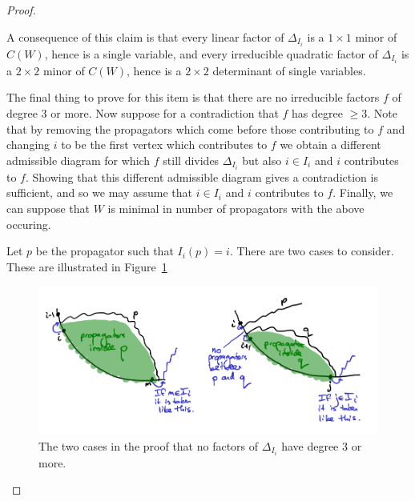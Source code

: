 \documentclass[11pt]{article}
\theoremstyle{remark}
\theoremstyle{definition}
\begin{document}
\begin{proof}
\begin{enumerate}
A consequence of this claim is that every linear factor of $\Delta_{I_i}$ is a $1\times 1$ minor of $C(W)$, hence is a single variable, and every irreducible quadratic factor of $\Delta_{I_i}$ is a $2\times 2$ minor of $C(W)$, hence is a $2\times 2$ determinant of single variables.

The final thing to prove for this item is that there are no irreducible factors $f$ of degree 3 or more.  Now suppose for a contradiction that $f$ has degree $\geq 3$. Note that by removing the propagators which come before those contributing to $f$ and changing $i$ to be the first vertex which contributes to $f$ we obtain a different admissible diagram for which $f$ still divides $\Delta_{I_i}$ but also $i\in I_i$ and $i$ contributes to $f$.  Showing that this different admissible diagram gives a contradiction is sufficient, and so we may assume that $i\in I_i$ and $i$ contributes to $f$.  Finally, we can suppose that $W$ is minimal in number of propagators with the above occuring.

Let $p$ be the propagator such that $I_i(p) = i$. There are two cases to consider.  These are illustrated in Figure~\ref{fig no big factors}

\begin{figure}
  \includegraphics{no_big_factors}
  \caption{The two cases in the proof that no factors of $\Delta_{I_i}$ have degree 3 or more.}\label{fig no big factors}
\end{figure}


\end{enumerate}
\end{proof}
\end{document}
